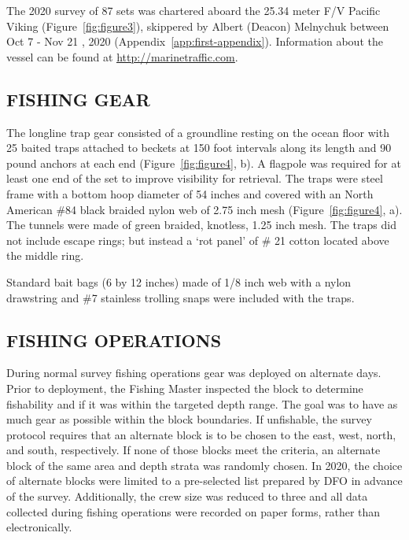 \documentclass[12pt]{article}\usepackage[]{graphicx}\usepackage[]{color}
\begin{document}
The 2020 survey of 87 sets was chartered aboard the 25.34 meter F/V Pacific Viking (Figure~\ref{fig:figure3}), skippered by Albert (Deacon) Melnychuk between Oct 7 - Nov 21 , 2020 (Appendix~\ref{app:first-appendix}). Information about the vessel can be found at \href{http://marinetraffic.com}{\underline{http://marinetraffic.com}}.

\hypertarget{fishing-gear}{%
\subsection{FISHING GEAR}\label{fishing-gear}}

The longline trap gear consisted of a groundline resting on the ocean floor with 25 baited traps attached to beckets at 150 foot intervals along its length and 90 pound anchors at each end (Figure~\ref{fig:figure4}, b). A flagpole was required for at least one end of the set to improve visibility for retrieval. The traps were steel frame with a bottom hoop diameter of 54 inches and covered with an North American \#84 black braided nylon web of 2.75 inch mesh (Figure~\ref{fig:figure4}, a). The tunnels were made of green braided, knotless, 1.25 inch mesh. The traps did not include escape rings; but instead a `rot panel' of \# 21 cotton located above the middle ring.

Standard bait bags (6 by 12 inches) made of 1/8 inch web with a nylon drawstring and \#7 stainless trolling snaps were included with the traps.

\hypertarget{fishing-operations}{%
\subsection{FISHING OPERATIONS}\label{fishing-operations}}

During normal survey fishing operations gear was deployed on alternate days. Prior to deployment, the Fishing Master inspected the block to determine fishability and if it was within the targeted depth range. The goal was to have as much gear as possible within the block boundaries. If unfishable, the survey protocol requires that an alternate block is to be chosen to the east, west, north, and south, respectively. If none of those blocks meet the criteria, an alternate block of the same area and depth strata was randomly chosen. In 2020, the choice of alternate blocks were limited to a pre-selected list prepared by DFO in advance of the survey. Additionally, the crew size was reduced to three and all data collected during fishing operations were recorded on paper forms, rather than electronically.
\end{document}
